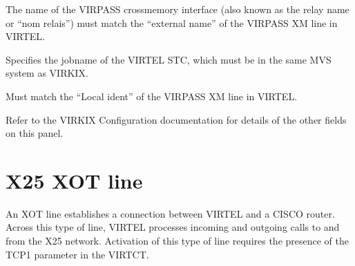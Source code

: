 \documentclass[letterpaper,10pt,english]{sphinxmanual}
\begin{document}
\sphinxAtStartPar
{}
\begin{description}
\sphinxAtStartPar
The name of the VIRPASS cross\sphinxhyphen{}memory interface (also known as the
relay name or “nom relais”) must match the “external name” of the
VIRPASS XM line in VIRTEL.

\sphinxAtStartPar
Specifies the jobname of the VIRTEL STC, which must be in the same
MVS system as VIRKIX.

\sphinxAtStartPar
Must match the “Local ident” of the VIRPASS XM line in VIRTEL.

\sphinxAtStartPar
Refer to the VIRKIX Configuration documentation for details of the
other fields on this panel.

\end{description}

\newpage

\ignorespaces 

\section{X25 XOT line}
\label{\detokenize{connectivity_guide:x25-xot-line}}\label{\detokenize{connectivity_guide:index-51}}
\sphinxAtStartPar
An XOT line establishes a connection between VIRTEL and a CISCO router. Across this type of line, VIRTEL processes incoming and outgoing calls to and from the X25 network. Activation of this type of line requires the presence of the TCP1 parameter in the VIRTCT.

\sphinxAtStartPar
{}

\ignorespaces 
\end{document}
